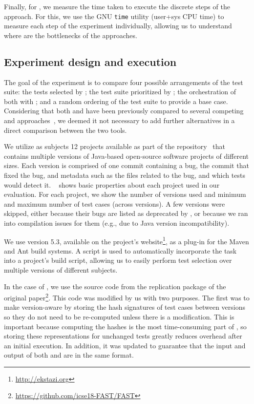 Finally, for , we measure the time taken to execute the discrete steps of the approach.
For this, we use the GNU \texttt{time} utility (user+sys CPU time) to measure each step of the experiment individually, allowing us to understand where are the bottlenecks of the approaches.

\subsection{Experiment design and execution}
\label{subsec:experiment}



The goal of the experiment is to compare four possible arrangements of the test suite: 
the tests selected by \ek; the test suite prioritized by \fs; the orchestration of both with \fz; and a random ordering of the test suite to provide a base case.
Considering that both \ek and \fs have been previously compared to several competing \tcs and \tcp approaches~\cite{legunsen2016, Zhang18HybridRTS,miranda_fast}, we deemed it not necessary to add further alternatives in a direct comparison between the two tools.

We utilize as subjects 12 projects available as part of the \dfj repository~\cite{just2014defects4j} that contains multiple versions of Java-based open-source software projects of different sizes.
Each version is comprised of one commit containing a bug, the commit that fixed the bug, and metadata such as the files related to the bug, and which tests would detect it.
~ shows basic properties about each project
used in our evaluation.
For each project, we show the number of versions used and minimum and maximum number of test cases (across versions).
A few versions were skipped, either because their bugs are listed as deprecated by \dfj, or because we ran into compilation issues for them (e.g., due to Java version incompatibility).

We use \ek version 5.3, available on the project's website\footnote{\url{http://ekstazi.org}}, as a plug-in for the Maven and Ant build systems.
A script is used to automatically incorporate the \ek task into a project's build script, allowing us to easily perform test selection over multiple versions of different subjects.

In the case of \fs, we use the source code from the replication package of the original paper\footnote{\url{https://github.com/icse18-FAST/FAST}}.
This code was modified by us with two purposes.
The first was to make \fs version-aware by storing the hash signatures of test cases between versions so they do not need to be re-computed unless there is a modification.
This is important because computing the hashes is the most time-consuming part of \fs, so storing these representations for unchanged tests greatly reduces overhead after an initial execution.
In addition, it was updated to guarantee that the input and output of both \ek and \fs are in the same format.

